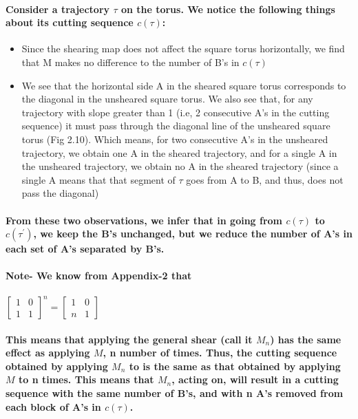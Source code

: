 \documentclass{report}
\begin{document}
\paragraph{Consider a trajectory $\tau$ on the torus. We notice the following things about its cutting sequence $c(\tau)$:}
\begin{itemize}
\item  {Since the shearing map does not affect the square torus horizontally, we find that M makes no difference to the number of B’s in $c(\tau)$}
\item  {We see that the horizontal side A in the sheared square torus corresponds to the diagonal in the unsheared square torus. We also see that, for any trajectory with slope greater than 1 (i.e, 2 consecutive A’s in the cutting sequence) it must pass through the diagonal line of the unsheared square torus (Fig 2.10). Which means, for two consecutive A’s in the unsheared trajectory, we obtain one A in the sheared trajectory, and for a single A in the unsheared trajectory, we obtain no A in the sheared trajectory (since a single A means that that segment of $\tau$ goes from A to B, and thus, does not pass the diagonal)}
\end{itemize}

\paragraph{From these two observations, we infer that in going from $c(\tau)$ to $c(\tau ^{'})$, we keep the B’s unchanged, but we reduce the number of A’s in each set of A’s separated by B’s. }

\paragraph{Note- We know from Appendix-2 that }
$\begin{bmatrix} 1&0\\1&1 \end{bmatrix}^{n} = \begin{bmatrix} 1&0\\n&1 \end{bmatrix}$

\paragraph{This means that applying the general shear (call it $M_{n}$) has the same effect as applying $M$, n number of times. Thus, the cutting sequence obtained by applying $M_{n}$ to  is the same as that obtained by applying $M$ to n times. This means that $M_{n}$, acting on, will result in a cutting sequence with the same number of B’s, and with n A’s removed from each block of A’s in $c(\tau)$.}
\end{document}
